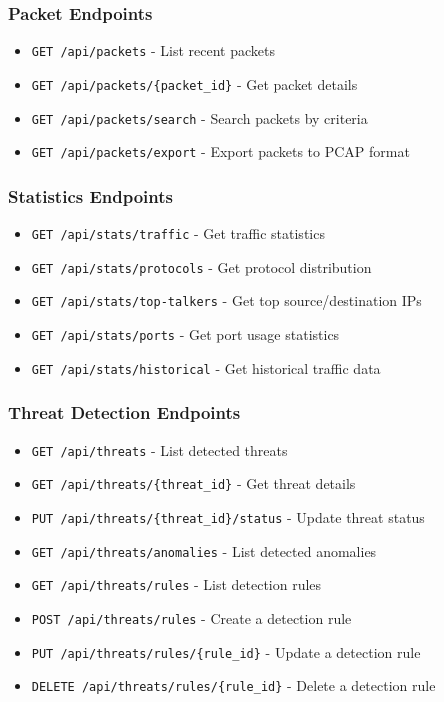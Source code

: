\subsubsection{Packet Endpoints}
\begin{itemize}
    \item \texttt{GET /api/packets} - List recent packets
    \item \texttt{GET /api/packets/\{packet\_id\}} - Get packet details
    \item \texttt{GET /api/packets/search} - Search packets by criteria
    \item \texttt{GET /api/packets/export} - Export packets to PCAP format
\end{itemize}

\subsubsection{Statistics Endpoints}
\begin{itemize}
    \item \texttt{GET /api/stats/traffic} - Get traffic statistics
    \item \texttt{GET /api/stats/protocols} - Get protocol distribution
    \item \texttt{GET /api/stats/top-talkers} - Get top source/destination IPs
    \item \texttt{GET /api/stats/ports} - Get port usage statistics
    \item \texttt{GET /api/stats/historical} - Get historical traffic data
\end{itemize}

\subsubsection{Threat Detection Endpoints}
\begin{itemize}
    \item \texttt{GET /api/threats} - List detected threats
    \item \texttt{GET /api/threats/\{threat\_id\}} - Get threat details
    \item \texttt{PUT /api/threats/\{threat\_id\}/status} - Update threat status
    \item \texttt{GET /api/threats/anomalies} - List detected anomalies
    \item \texttt{GET /api/threats/rules} - List detection rules
    \item \texttt{POST /api/threats/rules} - Create a detection rule
    \item \texttt{PUT /api/threats/rules/\{rule\_id\}} - Update a detection rule
    \item \texttt{DELETE /api/threats/rules/\{rule\_id\}} - Delete a detection rule
\end{itemize}

